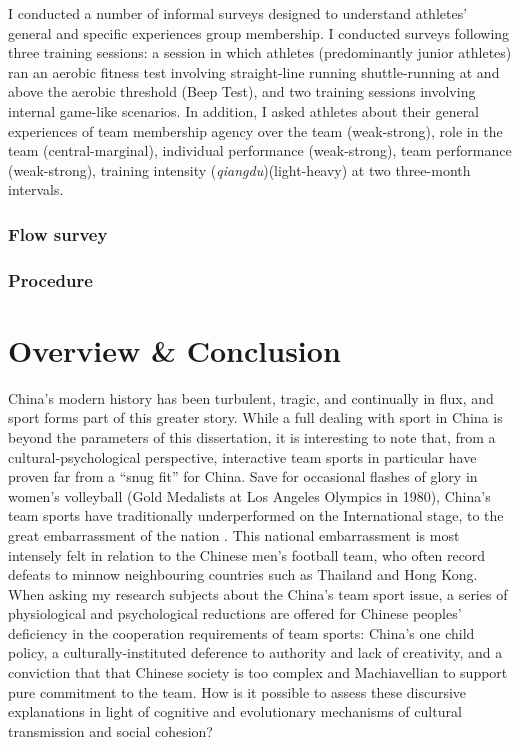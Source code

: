      I conducted a number of informal surveys designed to understand athletes' general and specific experiences group membership.  I conducted surveys following three training sessions: a session in which athletes (predominantly junior athletes) ran an aerobic fitness test involving straight-line running shuttle-running at and above the aerobic threshold (Beep Test), and two training sessions involving internal game-like scenarios.  In addition, I asked athletes about their general experiences of team membership agency over the team (weak-strong), role in the team (central-marginal), individual performance (weak-strong), team performance (weak-strong), training intensity (\textit{qiangdu})(light-heavy) at two three-month intervals.




    \subsubsection{Flow survey}
    \subsubsection{Procedure} %





  \section{Overview & Conclusion}










China's modern history has been turbulent, tragic, and continually in flux, and sport forms part of this greater story.  While a full dealing with sport in China is beyond the parameters of this dissertation, it is interesting to note that, from a cultural-psychological perspective, interactive team sports in particular have proven far from a ``snug fit'' for China.  Save for occasional flashes of glory in women's volleyball (Gold Medalists at Los Angeles Olympics in 1980), China's team sports have traditionally underperformed on the International stage, to the great embarrassment of the nation \citep{Brownell2008}.  This national embarrassment is most intensely felt in relation to the Chinese men's football team, who often record defeats to minnow neighbouring countries such as Thailand and Hong Kong. When asking my research subjects about the China's team sport issue, a series of physiological and psychological reductions are offered for Chinese peoples' deficiency in the cooperation requirements of team sports: China's one child policy, a culturally-instituted deference to authority and lack of creativity, and a conviction that that Chinese society is too complex and Machiavellian to support pure commitment to the team.  How is it possible to assess these discursive explanations in light of cognitive and evolutionary mechanisms of cultural transmission and social cohesion?

